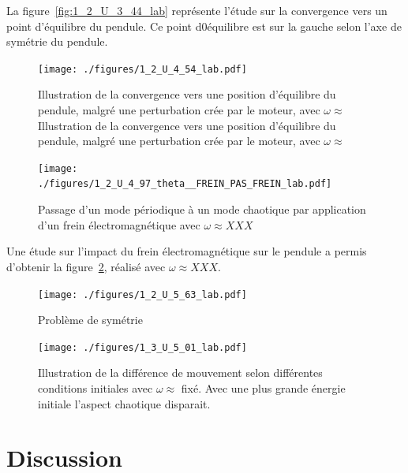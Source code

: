 \documentclass[a4paper,12pt,oneside]{article}
\begin{document}
La figure~\ref{fig:1_2_U_3_44_lab} représente l'étude sur la convergence vers un point d'équilibre du pendule. Ce point d0équilibre est sur la gauche selon l'axe de symétrie du pendule.

\begin{figure}[h!]
  \begin{center}
  \texttt{[image: ./figures/1\_2\_U\_4\_54\_lab.pdf]}
  \caption{Illustration de la convergence vers une position d'équilibre du pendule, malgré une perturbation crée par le moteur, avec $\omega \approx$Illustration de la convergence vers une position d'équilibre du pendule, malgré une perturbation crée par le moteur, avec $\omega \approx$} \label{fig:1_2_U_4_54_lab}
  \end{center}
\end{figure}

\begin{figure}[h!]
  \begin{center}
  \texttt{[image: ./figures/1\_2\_U\_4\_97\_theta\_\_FREIN\_PAS\_FREIN\_lab.pdf]}
  \caption{Passage d'un mode périodique à un mode chaotique par application d'un frein électromagnétique avec $\omega \approx XXX$} \label{fig:1_2_U_4_97_theta__FREIN_PAS_FREIN_lab}
  \end{center}
\end{figure}

Une étude sur l'impact du frein électromagnétique sur le pendule a permis d'obtenir la figure~\ref{fig:1_2_U_4_97_theta__FREIN_PAS_FREIN_lab}, réalisé avec $\omega \approx XXX$.

\begin{figure}[h!]
  \begin{center}
  \texttt{[image: ./figures/1\_2\_U\_5\_63\_lab.pdf]}
  \caption{Problème de symétrie} \label{fig:1_2_U_5_63_lab}
  \end{center}
\end{figure}

\begin{figure}[h!]
  \begin{center}
  \texttt{[image: ./figures/1\_3\_U\_5\_01\_lab.pdf]}
  \caption{Illustration de la différence de mouvement selon différentes conditions initiales avec $\omega\approx$ fixé. Avec une plus grande énergie initiale l'aspect chaotique disparait.} \label{fig:1_3_U_5_01_lab}
  \end{center}
\end{figure}
\section{Discussion}%
\end{document}
